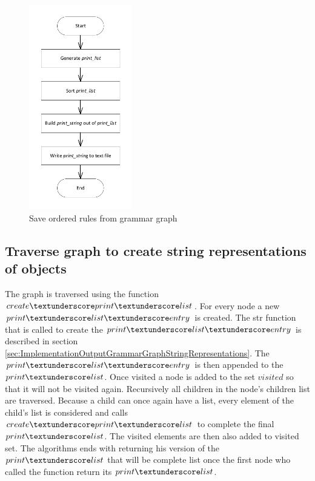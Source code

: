 \begin{figure}[H]
\centering
\includegraphics[width=0.4\textwidth]{images/Implementation_saveorderedrules.pdf}
\caption{Save ordered rules from grammar graph}
\label{fig:ImplementationOutputSaveOrderedRules}
\end{figure}

\subsection{Traverse graph to create string representations of objects}\label{sec:ImpolementationOutputGrammarGraphTraverse}

The graph is traversed using the function $create\textunderscore print\textunderscore list$. For every node a new $print\textunderscore list\textunderscore entry$ is created. The str function that is called to create the $print\textunderscore list\textunderscore entry$ is described in section \ref{sec:ImplementationOutputGrammarGraphStringRepresentations}. 
The $print\textunderscore list\textunderscore entry$ is then appended to the $print\textunderscore list$. Once visited a node is added to the set $visited$ so that it will not be visited again.
Recursively all children in the node's children list are traversed. Because a child can once again have a list, every element of the child's list is considered and calls $create\textunderscore print\textunderscore list$ to complete the final $print\textunderscore list$. The visited elements are then also added to visited set. The algorithms ends with returning his version of the $print\textunderscore list$ that will be complete list once the first node who called the function return its $print\textunderscore list$.

